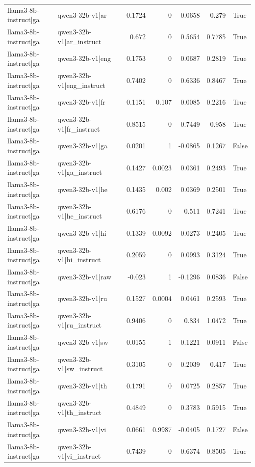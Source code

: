 \begin{table}
\begin{tabular}{l l r r r r l}
llama3-8b-instruct|ga & qwen3-32b-v1|ar & 0.1724 & 0 & 0.0658 & 0.279 & True \\
llama3-8b-instruct|ga & qwen3-32b-v1|ar_instruct & 0.672 & 0 & 0.5654 & 0.7785 & True \\
llama3-8b-instruct|ga & qwen3-32b-v1|eng & 0.1753 & 0 & 0.0687 & 0.2819 & True \\
llama3-8b-instruct|ga & qwen3-32b-v1|eng_instruct & 0.7402 & 0 & 0.6336 & 0.8467 & True \\
llama3-8b-instruct|ga & qwen3-32b-v1|fr & 0.1151 & 0.107 & 0.0085 & 0.2216 & True \\
llama3-8b-instruct|ga & qwen3-32b-v1|fr_instruct & 0.8515 & 0 & 0.7449 & 0.958 & True \\
llama3-8b-instruct|ga & qwen3-32b-v1|ga & 0.0201 & 1 & -0.0865 & 0.1267 & False \\
llama3-8b-instruct|ga & qwen3-32b-v1|ga_instruct & 0.1427 & 0.0023 & 0.0361 & 0.2493 & True \\
llama3-8b-instruct|ga & qwen3-32b-v1|he & 0.1435 & 0.002 & 0.0369 & 0.2501 & True \\
llama3-8b-instruct|ga & qwen3-32b-v1|he_instruct & 0.6176 & 0 & 0.511 & 0.7241 & True \\
llama3-8b-instruct|ga & qwen3-32b-v1|hi & 0.1339 & 0.0092 & 0.0273 & 0.2405 & True \\
llama3-8b-instruct|ga & qwen3-32b-v1|hi_instruct & 0.2059 & 0 & 0.0993 & 0.3124 & True \\
llama3-8b-instruct|ga & qwen3-32b-v1|raw & -0.023 & 1 & -0.1296 & 0.0836 & False \\
llama3-8b-instruct|ga & qwen3-32b-v1|ru & 0.1527 & 0.0004 & 0.0461 & 0.2593 & True \\
llama3-8b-instruct|ga & qwen3-32b-v1|ru_instruct & 0.9406 & 0 & 0.834 & 1.0472 & True \\
llama3-8b-instruct|ga & qwen3-32b-v1|sw & -0.0155 & 1 & -0.1221 & 0.0911 & False \\
llama3-8b-instruct|ga & qwen3-32b-v1|sw_instruct & 0.3105 & 0 & 0.2039 & 0.417 & True \\
llama3-8b-instruct|ga & qwen3-32b-v1|th & 0.1791 & 0 & 0.0725 & 0.2857 & True \\
llama3-8b-instruct|ga & qwen3-32b-v1|th_instruct & 0.4849 & 0 & 0.3783 & 0.5915 & True \\
llama3-8b-instruct|ga & qwen3-32b-v1|vi & 0.0661 & 0.9987 & -0.0405 & 0.1727 & False \\
llama3-8b-instruct|ga & qwen3-32b-v1|vi_instruct & 0.7439 & 0 & 0.6374 & 0.8505 & True \\

\end{tabular}
\end{table}
